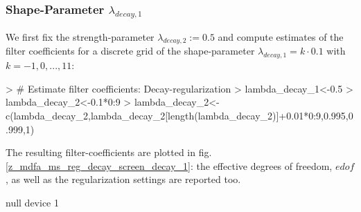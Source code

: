 \documentclass[a4paper]{book}
\begin{document}
\subsubsection{Shape-Parameter $\lambda_{decay,1}$}

 We first fix the strength-parameter $\lambda_{decay,2}:=0.5$ and compute estimates of the filter coefficients for a discrete grid of the shape-parameter $\lambda_{decay,1}=k\cdot 0.1$ with $k=-1,0,...,11$:  
\begin{Schunk}
\begin{Sinput}
> # Estimate filter coefficients: Decay-regularization
> lambda_decay_1<-0.5
> lambda_decay_2<-0.1*0:9
> lambda_decay_2<-c(lambda_decay_2,lambda_decay_2[length(lambda_decay_2)]+0.01*0:9,0.995,0.999,1)
\end{Sinput}
\end{Schunk}
The resulting filter-coefficients  are plotted in fig.\ref{z_mdfa_ms_reg_decay_screen_decay_1}: the effective degrees of freedom, $edof$, as well as the regularization settings are reported too.
\begin{Schunk}
\begin{Soutput}
null device 
          1 
\end{Soutput}
\end{Schunk}
\end{document}
